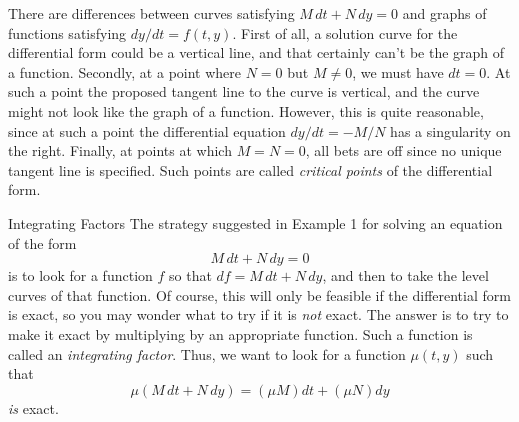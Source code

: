 There are differences between curves satisfying
$M\,dt + N\,dy = 0$ and graphs of functions satisfying
$dy/dt = f(t,y)$.  First of all, a solution curve for the
differential form could be
a vertical line, and that certainly can't be the
graph of a function.  Secondly, at a point where $N = 0$
but $M \not=0$, we must have $dt = 0$.  At such a point
the proposed tangent line to the curve is vertical, and
the curve might not look like the graph of a function.
However, this is quite reasonable, since at such a
point the differential equation $dy/dt = -M/N$ has
a singularity on the right.   Finally, at points at
which $M = N = 0$, all bets are off since no unique
tangent line is specified.  Such points are called
{\it critical points\/} of the differential form.
%

\medskip
\subhead Integrating Factors \endsubhead
The strategy suggested in Example 1 for solving an equation of
the form 
$$
  M\,dt + N\,dy = 0
$$
is to look for a function $f$ so that $df =  M\,dt + N\,dy$,
and then to take the level curves of that function.
Of course, this will only be feasible if the differential
form is exact, so you may wonder what to try if it is
{\it not\/} exact.  The answer is to try to make it exact
by multiplying by an appropriate function.  Such
a function is called an {\it integrating factor}.  Thus,
%
we want to look for a function $\mu(t,y)$ such that
$$
  \mu(M\,dt + N\,dy) = (\mu M)dt + (\mu N)dy
$$
{\it is\/} exact.

